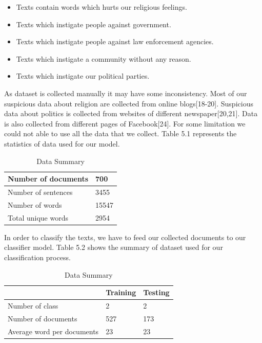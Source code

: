 \documentclass[12pt,a4paper]{report}
\begin{document}
\begin{itemize}
    \item Texts contain words which hurts our religious feelings.
    \item Texts which instigate people against government.
    \item Texts which instigate people against law enforcement agencies.
    \item Texts which instigate a community without any reason.
    \item Texts which instigate our political parties. 
    
\end{itemize}
As dataset is collected manually it may have some inconsistency.
\clearpage
\noindent
Most of our suspicious data about religion are collected from online blogs[18-20]. Suspicious data about politics is collected from websites of different newspaper[20,21]. Data is also collected from different pages of Facebook[24]. For some limitation we could not able to use all the data that we collect. Table 5.1 represents the statistics of data used for our model.
\renewcommand{\arraystretch}{1.3}
\begin{table}[h!]
\begin{center}
\caption{Data Summary}
\begin{tabular}{|m{6cm} | m{3cm}|}
\hline
     Number of documents & 700 \\
\hline
     Number of sentences & 3455\\
\hline 
     Number of words & 15547\\
\hline 
     Total unique words & 2954\\
\hline
\end{tabular}
\end{center}
\end{table}
\noindent
In order to classify the texts, we have to feed our collected documents to our classifier model. Table 5.2 shows the summary of dataset used for our classification process.
\renewcommand{\arraystretch}{1.3}
\begin{table}[h!]
\begin{center}
\caption{Data Summary}
\begin{tabular}{|m{6cm} | m{3cm}| m{3cm}|}
\hline
     & Training & Testing \\
\hline
     Number of class & 2 & 2\\
\hline 
     Number of documents & 527 & 173\\
\hline 
     Average word per documents & 23 & 23\\
\hline
\end{tabular}
\end{center}
\end{table}
\end{document}
